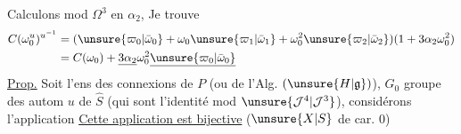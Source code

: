 Calculons mod $\Omega^3$ en   $\alpha_2$,
Je trouve
\[
\begin{aligned}
C(\omega_0^u)^{u^{-1}}&=(\unsure{\varpi_0|\bar\omega_0}+\omega_0\unsure{\varpi_1|\bar\omega_1}+\omega_0^2\unsure{\varpi_2|\bar\omega_2})(1+3\alpha_2\omega_0^2)\\
&=C(\omega_0)+\underline{3\alpha_2}\omega_0^2\underline{\unsure{\varpi_0|\bar\omega_0}}
\end{aligned}
\]
\uline{Prop.} Soit  l'ens des connexions  de $P$ (ou de l'Alg.  $(\unsure{H|\mathfrak g})$),  $G_0$  groupe des autom $u$ de $\widehat S$  (qui sont l'identité mod $\unsure{\mathcal J^4|\mathcal J^3}$), considérons l'application
\uline{Cette application est bijective} ($\unsure{X|S}$ de car. $0$)
